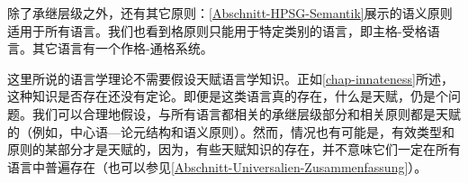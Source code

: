
除了承继层级之外，还有其它原则：\ref{Abschnitt-HPSG-Semantik}展示的语义原则适用于所有语言。我们也看到格原则只能用于特定类别的语言，即主格-受格语言。其它语言有一个作格-通格系统。

这里所说的语言学理论不需要假设天赋语言学知识。正如\ref{chap-innateness}所述，这种知识是否存在还没有定论。即便是这类语言真的存在，什么是天赋，仍是个问题。我们可以合理地假设，与所有语言都相关的承继层级部分和相关原则都是天赋的（例如，中心语—论元结构和语义原则）。然而，情况也有可能是，有效类型和原则的某部分才是天赋的，因为，有些天赋知识的存在，并不意味它们一定在所有语言中普遍存在（也可以参见\ref{Abschnitt-Universalien-Zusammenfassung}）。

